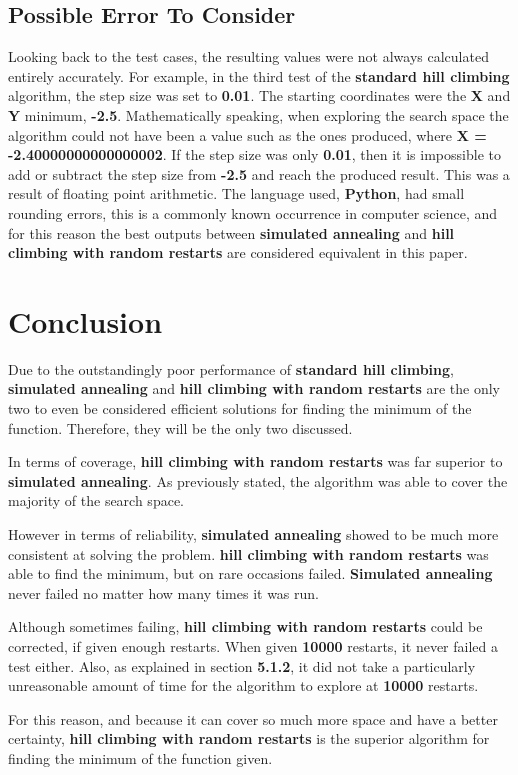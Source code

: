 \documentclass[]{report}
\begin{document}
	\subsection{Possible Error To Consider}
	Looking back to the test cases, the resulting values were not always calculated entirely accurately. For example, in the third test of the \textbf{standard hill climbing} algorithm, the step size was set to \textbf{0.01}. The starting coordinates were the \textbf{X} and \textbf{Y} minimum, \textbf{-2.5}. Mathematically speaking, when exploring the search space the algorithm could not have been a value such as the ones produced, where \textbf{X = -2.40000000000000002}. If the step size was only \textbf{0.01}, then it is impossible to add or subtract the step size from \textbf{-2.5} and reach the produced result. This was a result of floating point arithmetic. The language used, \textbf{Python}, had small rounding errors, this is a commonly known occurrence in computer science, and for this reason the best outputs between \textbf{simulated annealing} and \textbf{hill climbing with random restarts} are considered equivalent in this paper.\newpage
	
	\section{Conclusion}
	Due to the outstandingly poor performance of \textbf{standard hill climbing}, \textbf{simulated annealing} and \textbf{hill climbing with random restarts} are the only two to even be considered efficient solutions for finding the minimum of the function. Therefore, they will be the only two discussed.
	
	In terms of coverage, \textbf{hill climbing with random restarts} was far superior to \textbf{simulated annealing}. As previously stated, the algorithm was able to cover the majority of the search space.
	
	However in terms of reliability, \textbf{simulated annealing} showed to be much more consistent at solving the problem.  \textbf{hill climbing with random restarts} was able to find the minimum, but on rare occasions failed. \textbf{Simulated annealing} never failed no matter how many times it was run.
	
	Although sometimes failing, \textbf{hill climbing with random restarts} could be corrected, if given enough restarts. When given \textbf{10000} restarts, it never failed a test either. Also, as explained in section \textbf{5.1.2}, it did not take a particularly unreasonable amount of time for the algorithm to explore at \textbf{10000} restarts.
	
	For this reason, and because it can cover so much more space and have a better certainty, \textbf{hill climbing with random restarts} is the superior algorithm for finding the minimum of the function given.
	
\end{document}

